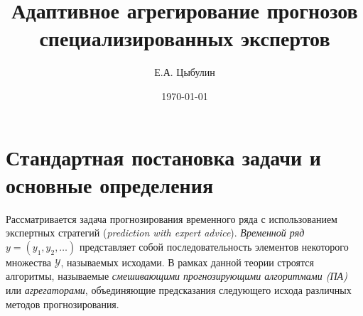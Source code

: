 \documentclass[a4paper,12pt]{article}
\title{Адаптивное агрегирование прогнозов специализированных экспертов}
\author{Е.А. Цыбулин} %
\date{\today} %
\theoremstyle{plain}
\theoremstyle{definition}
\theoremstyle{remark}
\numberwithin{equation}{section}
\begin{document}
\maketitle




\section{Стандартная постановка задачи и основные определения}
\label{sec:problem}
Рассматривается задача прогнозирования временного ряда с использованием экспертных стратегий (\textit{prediction with expert advice}). \textit{Временной ряд} $y = (y_1, y_2, \dots)$ представляет собой последовательность элементов некоторого множества $\mathcal{Y}$, называемых исходами. 
В рамках данной теории строятся алгоритмы, называемые \textit{смешивающими прогнозирующими алгоритмами (ПА)} или \textit{агрегаторами}, объединяющие предсказания следующего исхода различных методов прогнозирования. 
\end{document}
